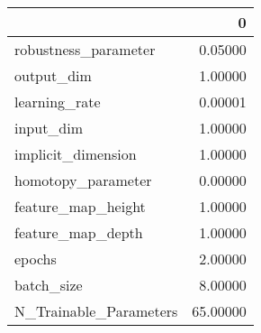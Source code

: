 \begin{tabular}{lr}
\toprule
{} &         0 \\
\midrule
robustness\_parameter   &   0.05000 \\
output\_dim             &   1.00000 \\
learning\_rate          &   0.00001 \\
input\_dim              &   1.00000 \\
implicit\_dimension     &   1.00000 \\
homotopy\_parameter     &   0.00000 \\
feature\_map\_height     &   1.00000 \\
feature\_map\_depth      &   1.00000 \\
epochs                 &   2.00000 \\
batch\_size             &   8.00000 \\
N\_Trainable\_Parameters &  65.00000 \\
\bottomrule
\end{tabular}
